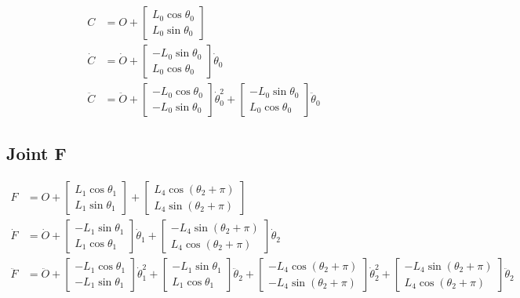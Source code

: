 \documentclass[letterpaper]{article}
\begin{document}
\begin{align}
	C &= O + \begin{bmatrix} L_0 \cos \theta_0\\ L_0 \sin \theta_0 \end{bmatrix} \\
	\dot{C} &= \dot{O} + \begin{bmatrix} -L_0 \sin \theta_0 \\ L_0 \cos \theta_0 \end{bmatrix} \dot{\theta}_0 \\
	\ddot{C} &= \ddot{O} + \begin{bmatrix} -L_0 \cos \theta_0 \\ - L_0 \sin \theta_0 \end{bmatrix} \dot{\theta}_0^2 + \begin{bmatrix} -L_0 \sin \theta_0 \\ L_0 \cos \theta_0 \end{bmatrix} \ddot{\theta}_0
\end{align}

\subsection{Joint F}

\begin{align}
	F &= O + \begin{bmatrix} L_1 \cos \theta_1 \\ L_1 \sin \theta_1 \end{bmatrix} + \begin{bmatrix} L_4 \cos(\theta_2 + \pi) \\ L_4 \sin(\theta_2 + \pi) \end{bmatrix} \\
	\dot{F} &= \dot{O} + \begin{bmatrix} -L_1 \sin \theta_1 \\ L_1 \cos \theta_1 \end{bmatrix} \dot{\theta}_1 + \begin{bmatrix} - L_4 \sin(\theta_2 + \pi) \\ L_4 \cos(\theta_2 + \pi) \end{bmatrix} \dot{\theta}_2 \\
	\ddot{F} &= \ddot{O} + \begin{bmatrix} -L_1 \cos \theta_1 \\ -L_1 \sin \theta_1 \end{bmatrix} \dot{\theta}_1^2 
		+ \begin{bmatrix} -L_1 \sin \theta_1 \\ L_1 \cos \theta_1 \end{bmatrix} \ddot{\theta}_2 
		+ \begin{bmatrix} -L_4 \cos(\theta_2 + \pi) \\ -L_4 \sin(\theta_2 + \pi) \end{bmatrix} \dot{\theta}_2^2 
		+ \begin{bmatrix} -L_4 \sin(\theta_2 + \pi) \\ L_4 \cos(\theta_2 + \pi) \end{bmatrix} \ddot{\theta}_2
\end{align}
\end{document}
